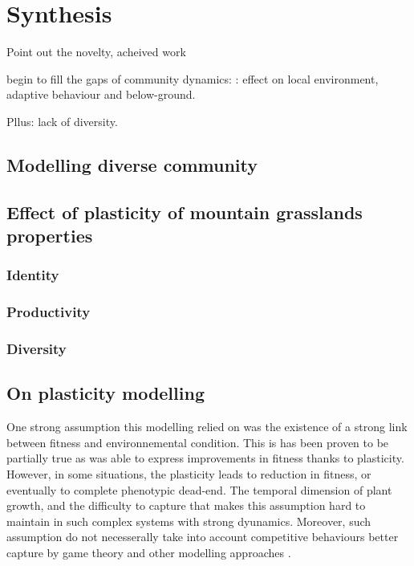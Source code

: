 

\chapter{Synthesis}

Point out the novelty, acheived work 

begin to fill the gaps of community dynamics: \parencite{berger_competition_2008}: effect on local environment, adaptive behaviour and below-ground.

Pllus: lack of diversity.

\section{Modelling diverse community}

\section{Effect of plasticity of mountain grasslands properties}

\subsection{Identity}
\subsection{Productivity}
\subsection{Diversity}

\section{On plasticity modelling}
One strong assumption this modelling relied on was the existence of a strong link between fitness and environnemental condition. This is has been proven to be partially true as \model was able to express improvements in fitness thanks to plasticity. However, in some situations, the plasticity leads to reduction in fitness, or eventually to complete phenotypic dead-end. The temporal dimension of plant growth, and the difficulty to capture that makes this assumption hard to maintain in such complex systems with strong dyunamics. Moreover, such assumption do not necesserally take into account competitive behaviours better capture by game theory and other modelling approaches \cite{farrior_resource_2011, dybzinski_evolutionarily_2011}.

